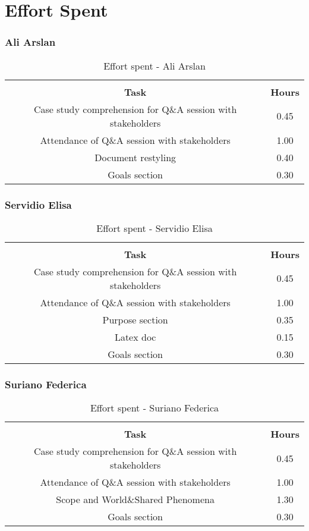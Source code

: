 \chapter{Effort Spent}

\subsection{Ali Arslan}
\begin{longtable}{|c|c|}
\hline
\endfirsthead
\endhead
\hline
\caption{Effort spent - Ali Arslan}\\
\endlastfoot
\rowcolor{white!40!black!50}
\textbf{Task} & \textbf{Hours}\\
\hline
Case study comprehension for Q\&A session with stakeholders & 0.45\\
\hline
Attendance of Q\&A session with stakeholders & 1.00\\
\hline
Document restyling	& 0.40\\
\hline
Goals section & 0.30\\	
\hline
\end{longtable}

\subsection{Servidio Elisa}
\begin{longtable}{|c|c|}
\hline
\endfirsthead
\endhead
\hline
\caption{Effort spent - Servidio Elisa}\\
\endlastfoot
\rowcolor{white!40!black!50}
\textbf{Task} & \textbf{Hours}\\
\hline
Case study comprehension for Q\&A session with stakeholders & 0.45\\
\hline
Attendance of Q\&A session with stakeholders & 1.00\\
\hline
Purpose section	& 0.35\\
\hline
Latex doc & 0.15\\
\hline
Goals section & 0.30\\	
\hline
\end{longtable}

\subsection{Suriano Federica}
\begin{longtable}{|c|c|}
\hline
\endfirsthead
\endhead
\hline
\caption{Effort spent - Suriano Federica}\\
\endlastfoot
\rowcolor{white!40!black!50}
\textbf{Task} & \textbf{Hours}\\
\hline
Case study comprehension for Q\&A session with stakeholders & 0.45\\
\hline
Attendance of Q\&A session with stakeholders & 1.00\\
\hline
Scope and World\&Shared Phenomena	& 1.30\\
\hline
Goals section & 0.30\\	
\hline
\end{longtable}
